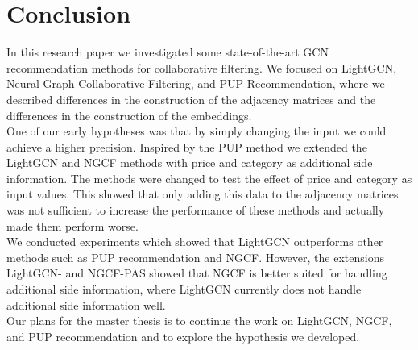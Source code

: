 \section{Conclusion}
In this research paper we investigated some state-of-the-art GCN recommendation methods for collaborative filtering.
We focused on LightGCN, Neural Graph Collaborative Filtering, and PUP Recommendation, where we described differences in the construction of the adjacency matrices and the differences in the construction of the embeddings.
\\
One of our early hypotheses was that by simply changing the input we could achieve a higher precision.
Inspired by the PUP method we extended the LightGCN and NGCF methods with price and category as additional side information.
The methods were changed to test the effect of price and category as input values.
This showed that only adding this data to the adjacency matrices was not sufficient to increase the performance of these methods and actually made them perform worse.
\\
We conducted experiments which showed that LightGCN outperforms other methods such as PUP recommendation and NGCF.
However, the extensions LightGCN- and NGCF-PAS showed that NGCF is better suited for handling additional side information, where LightGCN currently does not handle additional side information well.
\\
Our plans for the master thesis is to continue the work on LightGCN, NGCF, and PUP recommendation and to explore the hypothesis we developed.
